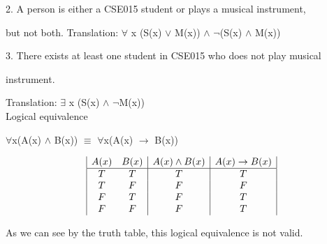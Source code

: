 \documentclass[10pt]{article}
\begin{document}
2. A person is either a CSE015 student or plays a musical instrument, 

but not both.
Translation: $\forall$ x (S(x) $\lor$ M(x)) $\land$ $\neg$(S(x) $\land$ M(x))

3. There exists at least one student in CSE015 who does not play musical 

instrument.

Translation: $\exists$ x (S(x) $\land$ $\neg$M(x))
\\[\baselineskip] 
Logical equivalence

$\forall$x(A(x) $\land$ B(x)) $\equiv$ $\forall$x(A(x) $\rightarrow$ B(x))

\begin{displaymath}
\begin{array}{|c c|c|c|}
A(x) & B(x) & A(x) \land B(x) & A(x) \rightarrow B(x)\\
\hline
T & T & T & T\\
T & F & F & F\\
F & T & F & T\\
F & F & F & T\\
\end{array}
\end{displaymath}

As we can see by the truth table, this logical equivalence is not valid.
\end{document}
